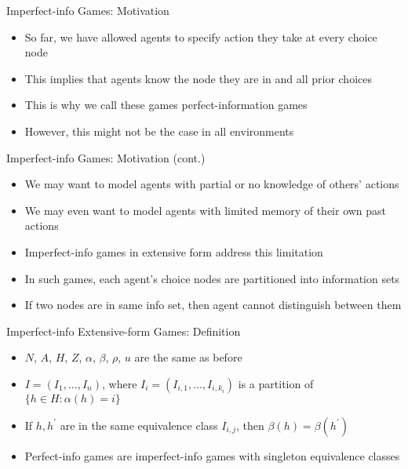 \documentclass[11pt,aspectratio=169,handout]{beamer}
\begin{document}
  \begin{frame}{Imperfect-info Games: Motivation}
   \begin{itemize}[<+->]
   \setlength{\itemsep}{1.2em}
    \item So far, we have allowed agents to specify action they take at every choice node
    \item This implies that agents know the node they are in and all prior choices
    \item This is why we call these games \alert{perfect-information} games
    \item However, this might not be the case in all environments
   \end{itemize}
  \end{frame}
  
    \begin{frame}{Imperfect-info Games: Motivation (cont.)}
   \begin{itemize}[<+->]
   \setlength{\itemsep}{1.2em}
    \item We may want to model agents with \alert{partial or no knowledge} of others' actions
    \item We may even want to model agents with \alert{limited memory} of their \alert{own} past actions
    \item \alert{Imperfect-info} games in extensive form address this limitation
    \item In such games, each agent's choice nodes are partitioned into \alert{information sets}
    \item If two nodes are in same info set, then agent cannot distinguish between them
   \end{itemize}
  \end{frame}
 
  \begin{frame}{Imperfect-info Extensive-form Games: Definition}
   \begin{itemize}
   \setlength{\itemsep}{1.5em}
    \item $N$, $A$, $H$, $Z$, $\alpha$, $\beta$, $\rho$, $u$ are the same as before
    \item $I = (I_1,...,I_n)$, where $I_i = (I_{i,1},...,I_{i,k_i})$ is a partition of $\{h \in H : \alpha(h) = i\}$
    \item If $h, h^\prime$ are in the same \alert{equivalence class} $I_{i,j}$, then $\beta(h) = \beta(h^\prime)$
    \item Perfect-info games are imperfect-info games with singleton equivalence classes
   \end{itemize}
  \end{frame}
\end{document}
